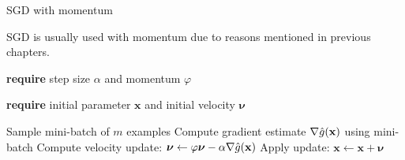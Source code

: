\documentclass[11pt,compress,t,notes=noshow, xcolor=table]{beamer}
\begin{document}
	



\begin{vbframe}{SGD with momentum}
		
SGD is usually used with momentum due to reasons mentioned in previous chapters.

\begin{algorithm}[H]
    \small
    \caption{Stochastic gradient descent with momentum}
    \begin{algorithmic}[1]
        \State \textbf{require} step size $\alpha$ and momentum $\varphi$ \strut
        \State \textbf{require} initial parameter $\bm{x}$ and initial velocity $\bm{\nu}$ \strut
        \State Sample mini-batch of $m$ examples
        \State Compute gradient estimate $\nabla \hat{g}(\mathbf{x})$ using mini-batch
        \State Compute velocity update: $\bm{\nu} \leftarrow \varphi \bm{\nu} - \alpha \nabla \hat{g}(\mathbf{x})$
        \State Apply update: $\bm{x} \leftarrow \bm{x} + \bm{\nu}$
        \EndWhile
    \end{algorithmic}
\end{algorithm}

\end{vbframe}

\end{document}
